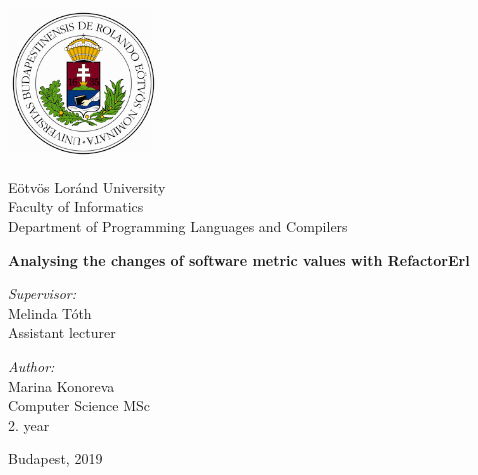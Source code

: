 \documentclass[runningheads,a4paper]{report}
\begin{document}


\begin{titlepage}
  \noindent
  \begin{minipage}{0.25 \textwidth}
    \includegraphics[height=40mm]{figures/cimer.png}
  \end{minipage}
  \hfill
  \begin{minipage}{0.67 \textwidth}
    \large
    Eötvös Loránd University \\
    Faculty of Informatics \\
    Department of Programming Languages and Compilers \\
    
  \end{minipage}

  \vfill

  \begin{center}
    {\LARGE \bfseries Analysing the changes of software metric values with RefactorErl}
    \\[6cm]
    \begin{minipage}[t]{0.45 \textwidth}
      \emph{Supervisor:} \\[0.25 \baselineskip]
      {\large Melinda Tóth} \\[0.5 \baselineskip]
      Assistant lecturer
    \end{minipage}
    \begin{minipage}[t]{0.45 \textwidth}
      \begin{flushright}
        \emph{Author:} \\[0.25 \baselineskip]
        {\large Marina Konoreva} \\[0.5 \baselineskip]
        Computer Science MSc \\ %
        2. year
      \end{flushright}
    \end{minipage}
  \end{center}

  \vfill

  \begin{center}
    \large Budapest, 2019
  \end{center}
\end{titlepage}
\end{document}
